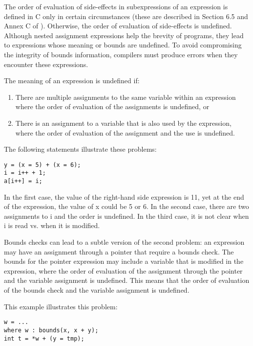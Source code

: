 The order of evaluation of side-effects in subexpressions of an
expression is defined in C only in certain circumstances (these are
described in Section 6.5 and Annex C of \cite{ISO2011}). Otherwise, the order of
evaluation of side-effects is undefined. Although nested assignment
expressions help the brevity of programs, they lead to expressions whose
meaning or bounds are undefined. To avoid compromising the integrity of
bounds information, compilers must produce errors when they encounter
these expressions.

The meaning of an expression is undefined if:

\begin{enumerate}
\item
  There are multiple assignments to the same variable within an
  expression where the order of evaluation of the assignments is
  undefined, or
\item
  There is an assignment to a variable that is also used by the
  expression, where the order of evaluation of the assignment and the
  use is undefined.
\end{enumerate}

The following statements illustrate these problems:

\begin{verbatim}
y = (x = 5) + (x = 6);
i = i++ + 1;
a[i++] = i;
\end{verbatim}

In the first case, the value of the right-hand side expression is 11,
yet at the end of the expression, the value of x could be 5 or 6. In the
second case, there are two assignments to i and the order is undefined.
In the third case, it is not clear when i is read vs. when it is
modified.

Bounds checks can lead to a subtle version of the second problem: an
expression may have an assignment through a pointer that require a
bounds check. The bounds for the pointer expression may include a
variable that is modified in the expression, where the order of
evaluation of the assignment through the pointer and the variable
assignment is undefined. This means that the order of evaluation of the
bounds check and the variable assignment is undefined.

This example illustrates this problem:

\begin{verbatim}
w = ...
where w : bounds(x, x + y);
int t = *w + (y = tmp);
\end{verbatim}

